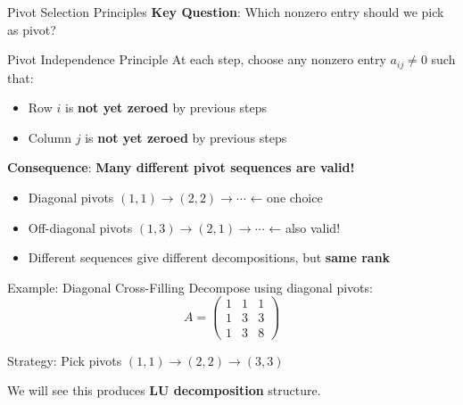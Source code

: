 \documentclass[10pt]{beamer}
\theoremstyle{definition}
\newcommand{\x}[1]{\alert{\textbf{#1}}}
\begin{document}
\begin{frame}{Pivot Selection Principles}
\textbf{Key Question}: Which nonzero entry should we pick as pivot?

\vfill
\begin{alertblock}{Pivot Independence Principle}
At each step, choose any nonzero entry $a_{ij} \neq 0$ such that:
\begin{itemize}
\item Row $i$ is \x{not yet zeroed} by previous steps
\item Column $j$ is \x{not yet zeroed} by previous steps
\end{itemize}
\end{alertblock}


\vfill
\textbf{Consequence}: \x{Many different pivot sequences are valid!}
\begin{itemize}
\item Diagonal pivots $(1,1) \to (2,2) \to \cdots$ ← one choice
\item Off-diagonal pivots $(1,3) \to (2,1) \to \cdots$ ← also valid!
\item Different sequences give different decompositions, but \x{same rank}
\end{itemize}
\end{frame}

\begin{frame}{Example: Diagonal Cross-Filling}
Decompose using diagonal pivots:
$$A = \begin{pmatrix}
1 & 1 & 1 \\
1 & 3 & 3 \\
1 & 3 & 8
\end{pmatrix}$$

\vfill
Strategy: Pick pivots $(1,1) \to (2,2) \to (3,3)$

\vfill
We will see this produces \x{LU decomposition} structure.
\end{frame}
\end{document}
